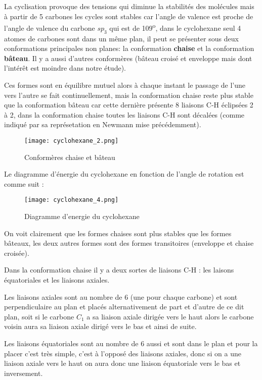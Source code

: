 \documentclass[a4paper, oneside]{book}
\begin{document}
La cyclisation provoque des tensions qui diminue la stabilités des molécules mais à partir de 5 carbones les cycles sont stables car l'angle de valence est proche de l'angle de valence du carbone $sp_3$ qui est de 109\textsuperscript{o}, dans le cyclohexane seul 4 atomes de carbones sont dans un même plan, il peut se présenter sous deux conformations principales non planes: la conformation \textbf{chaise} et la conformation \textbf{bâteau}. Il y a aussi d'autres conformères (bâteau croisé et enveloppe mais dont l'intérêt est moindre dans notre étude). 

Ces formes sont en équilibre mutuel alors à chaque instant le passage de l'une vers l'autre se fait continuellement, mais la conformation chaise reste plus stable que la conformation bâteau car cette dernière présente 8 liaisons C-H éclipsées 2 à 2, dans la conformation chaise toutes les liaisons C-H sont décalées (comme indiqué par sa représetation en Newmann mise précédemment).
\begin{figure}[!h]
    \centering
    \texttt{[image: cyclohexane\_2.png]}
    \caption{Conformères chaise et bâteau}
    \label{fig:my_label}
\end{figure}

Le diagramme d'énergie du cyclohexane en fonction de l'angle de rotation est comme suit :
\begin{figure}[!h]
    \centering
    \texttt{[image: cyclohexane\_4.png]}
    \caption{Diagramme d'energie du cyclohexane}
    \label{fig:my_label}
\end{figure}

On voit clairement que les formes chaises sont plus stables que les formes bâteaux, les deux autres formes sont des formes transitoires (enveloppe et chaise croisée).

Dans la conformation chaise il y a deux sortes de liaisons C-H : les laisons équatoriales et les liaisons axiales.

Les liaisons axiales sont au nombre de 6 (une pour chaque carbone) et sont perpendiculaire au plan et placés alternativement de part et d'autre de ce dit plan, soit si le carbone $C_1$ a sa liaison axiale dirigée vers le haut alors le carbone voisin aura sa liaison axiale dirigé vers le bas et ainsi de suite.

Les liaisons équatoriales sont au nombre de 6 aussi et sont dans le plan et pour la placer c'est très simple, c'est à l'opposé des liaisons axiales, donc si on a une liaison axiale vers le haut on aura donc une liaison équatoriale vers le bas et inversement. 
\end{document}

